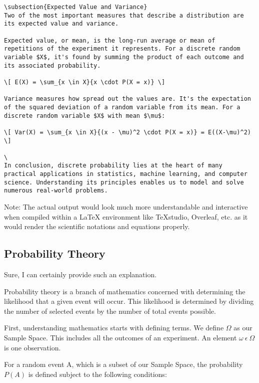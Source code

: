 \begin{verbatim}
\subsection{Expected Value and Variance}
Two of the most important measures that describe a distribution are its expected value and variance.

Expected value, or mean, is the long-run average or mean of repetitions of the experiment it represents. For a discrete random variable $X$, it's found by summing the product of each outcome and its associated probability.

\[ E(X) = \sum_{x \in X}{x \cdot P(X = x)} \]

Variance measures how spread out the values are. It's the expectation of the squared deviation of a random variable from its mean. For a discrete random variable $X$ with mean $\mu$:

\[ Var(X) = \sum_{x \in X}{(x - \mu)^2 \cdot P(X = x)} = E((X-\mu)^2) \]

\ 
In conclusion, discrete probability lies at the heart of many practical applications in statistics, machine learning, and computer science. Understanding its principles enables us to model and solve numerous real-world problems.

\end{verbatim}

Note: The actual output would look much more understandable and interactive when compiled within a LaTeX environment like TeXstudio, Overleaf, etc. as it would render the scientific notations and equations properly.

\subsection{Probability Theory}
Sure, I can certainly provide such an explanation. 

Probability theory is a branch of mathematics concerned with determining the likelihood that a given event will occur. This likelihood is determined by dividing the number of selected events by the number of total events possible.

First, understanding mathematics starts with defining terms. We define $\Omega$ as our Sample Space. This includes all the outcomes of an experiment. An element $\omega \ \epsilon \ \Omega$ is one observation.

For a random event A, which is a subset of our Sample Space, the probability $P(A)$ is defined subject to the following conditions:

